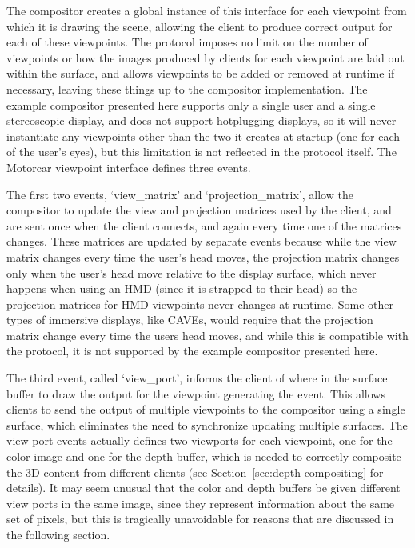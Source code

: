 The compositor creates a global instance of this interface for each viewpoint from which it is drawing the scene, allowing the client to produce correct output for each of these viewpoints. The protocol imposes no limit on the number of viewpoints or how the images produced by clients for each viewpoint are laid out within the surface, and allows viewpoints to be added or removed at runtime if necessary, leaving these things up to the compositor implementation. The example compositor presented here supports only a single user and a single stereoscopic display, and does not support hotplugging displays, so it will never instantiate any viewpoints other than the two it creates at startup (one for each of the user's eyes), but this limitation is not reflected in the protocol itself. The Motorcar viewpoint interface defines three events. 

The first two events, `view{\_}matrix' and `projection{\_}matrix', allow the compositor to update the view and projection matrices used by the client, and are sent once when the client connects, and again every time one of the matrices changes. These matrices are updated by separate events because while the view matrix changes every time the user's head moves, the projection matrix changes only when the user's head move relative to the display surface, which never happens when using an HMD (since it is strapped to their head) so the projection matrices for HMD viewpoints never changes at runtime. Some other types of immersive displays, like CAVEs, would require that the projection matrix change every time the users head moves, and while this is compatible with the protocol, it is not supported by the example compositor presented here.

The third event, called `view{\_}port', informs the client of where in the surface buffer to draw the output for the viewpoint generating the event. This allows clients to send the output of multiple viewpoints to the compositor using a single surface, which eliminates the need to synchronize updating multiple surfaces. The view port events actually defines two viewports for each viewpoint, one for the color image and one for the depth buffer, which is needed to correctly composite the 3D content from different clients (see Section~\ref{sec:depth-compositing} for details). It may seem unusual that the color and depth buffers be given different view ports in the same image, since they represent information about the same set of pixels, but this is tragically unavoidable for reasons that are discussed in the following section.

